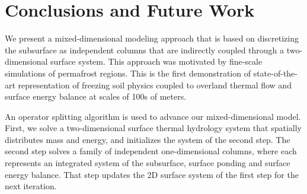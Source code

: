 \documentclass[review]{elsarticle}
\begin{document}
\section{Conclusions and Future Work}\label{conclusion}

We present a mixed-dimensional modeling approach that is based on discretizing  the subsurface as independent columns that are indirectly coupled through a two-dimensional surface system. This approach was motivated by fine-scale simulations of permafrost regions. This is the first demonstration of state-of-the-art representation of freezing soil physics coupled to overland thermal flow and surface energy balance at scales of 100s of meters.

  



An operator splitting algorithm is used to advance our mixed-dimensional model. First, we solve a two-dimensional surface thermal hydrology system that spatially distributes mass and energy, and initializes the system of the second step. The second step solves a family of independent one-dimensional columns, where each represents an integrated system of the subsurface, surface ponding and surface energy balance. That step updates the 2D surface system of the first step for the next iteration.
\end{document}
